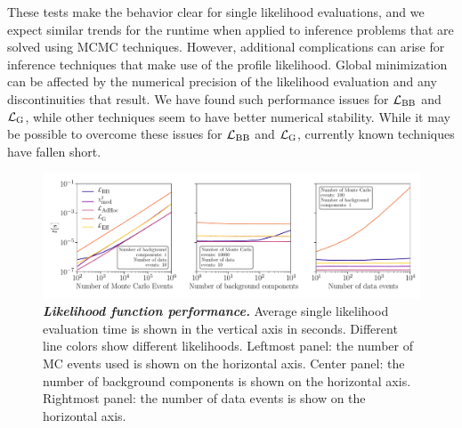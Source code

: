 These tests make the behavior clear for single likelihood evaluations, and we expect similar trends for the runtime when applied to inference problems that are solved using MCMC techniques.
However, additional complications can arise for inference techniques that make use of the profile likelihood.
Global minimization can be affected by the numerical precision of the likelihood evaluation and any discontinuities that result.
We have found such performance issues for $\mathcal{L}_{\textmd{BB}}$ and $\mathcal{L}_\textmd{G}$, while other techniques seem to have better numerical stability.
While it may be possible to overcome these issues for $\mathcal{L}_{\textmd{BB}}$ and $\mathcal{L}_\textmd{G}$, currently known techniques have fallen short.

\begin{figure}
\centering
    \includegraphics[width=1\linewidth]{fig/fig7_multi_panel}
\caption{\textbf{\textit{Likelihood function performance.}} Average single likelihood evaluation time is shown in the vertical axis in seconds.
Different line colors show different likelihoods.
Leftmost panel: the number of MC events used is shown on the horizontal axis.
Center panel: the number of background components is shown on the horizontal axis.
Rightmost panel: the number of data events is show on the horizontal axis.}
\label{fig:performance}
\end{figure}
